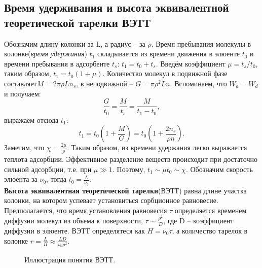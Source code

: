 \documentclass[12pt]{article}
\begin{document}
\begin{flushleft}
\subsection{ Время удерживания и высота эквивалентной теоретической тарелки ВЭТТ}
Обозначим длину колонки за L, а радиус -- за $\rho$. Время пребывания молекулы в колонке(\textit{время удержания}) $t_1$ складывается из времени движения в элюенте $t_0$ и времени пребывания в адсорбенте $t_s$: $t_1 = t_0 + t_s$. Введём коэффициент $\mu = t_s/t_0$, таким образом, $t_1 = t_0(1 + \mu)$. Количество молекул в  подвижной фазе составляет$ M = 2\pi\rho Ln_s$, в неподвижной -- $G = \pi\rho^2Ln$. Вспоминаем, что $W_a = W_d$ и получаем: 
\begin{equation}
\frac{G}{t_0} = \frac{M}{t_s} = \frac{M}{t_1 - t_0},
\end{equation}
выражаем отсюда $t_1$:
\begin{equation}
t_1 = t_0(1 + \frac{M}{G}) = t_0(1 + \frac{2n_s}{\rho n}).
\end{equation}
Заметим, что $\chi = \frac{2\mu}{\rho}$. Таким образом, из времени удержания легко выражается теплота адсорбции.
Эффективное разделение веществ происходит при достаточно сильной адсорбции, т.е. при $\mu \gg 1$. Поэтому, $t_1 \sim \mu t_0 \sim \chi$.  Обозначим скорость элюента за $\nu_0$, тогда $t_0 = \frac{L}{\nu_0}$.\\
\textbf{Высота эквивалентная теоретической тарелки}(ВЭТТ) равна длине участка колонки, на котором успевает установиться сорбционное равновесие. Предполагается, что время установления равновесия $\tau$ определяется временем диффузии молекул из объема к поверхности, $\tau \sim \frac{\rho^2}{D}$, где D -- коэффициент диффузии в элюенте. ВЭТТ определятеся как $H = \nu_0\tau$, а количество тарелок в колонке $r = \frac{L}{H} \approx \frac{LD}{\nu_0\rho^2}$.
\begin{figure}[!h]
\caption{Иллюстрация понятия ВЭТТ.}
\label{ris:image}
\end{figure}

\end{flushleft}
\end{document}
